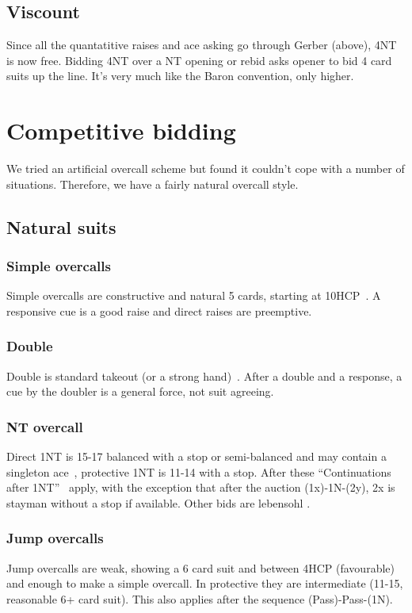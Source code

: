 \documentclass[a4paper,14pt]{extarticle}
\begin{document}
\subsection{Viscount}
\label{sec:viscount}
\label{note:23}

Since all the quantatitive raises and ace asking go through Gerber (above), 4NT
is now free. Bidding 4NT over a NT opening or rebid asks opener to bid 4 card
suits up the line. It's very much like the Baron convention, only higher.

\section{Competitive bidding}
\label{sec:competitive}

We tried an artificial overcall scheme but found it couldn't cope with a number of situations.
Therefore, we have a fairly natural overcall style.

\subsection{Natural suits}
\label{sec:def:1x}

\subsubsection{Simple overcalls}
\label{note:11}
Simple overcalls are constructive and natural 5 cards, starting at
10HCP~. A responsive cue is a good raise and
direct raises are preemptive.

\subsubsection{Double}
Double is standard takeout (or a strong hand)~. After a double and
a response, a cue by the doubler is a general force, not suit agreeing.

\subsubsection{NT overcall}
Direct 1NT is 15-17 balanced with a stop or semi-balanced and may contain a
singleton ace~, protective 1NT is 11-14 with a stop.  After these
``Continuations after 1NT''~ apply, with the exception that
after the auction (1x)-1N-(2y), 2x is stayman without a stop if available.
Other bids are lebensohl .

\subsubsection{Jump overcalls}
Jump overcalls are weak, showing a 6 card suit and between 4HCP (favourable)
and enough to make a simple overcall. In protective they are intermediate
(11-15, reasonable 6+ card suit). This also applies after the sequence (Pass)-Pass-(1N).
\end{document}
